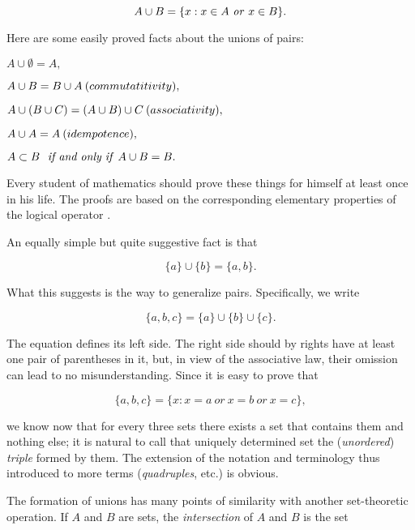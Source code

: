 \begin{equation*}
A \cup B = \{x: x \in A \text{ \textit{or} } x \in B \}.
\end{equation*}

Here are some easily proved facts about the unions of pairs:
\begin{center}
$A \cup \emptyset = A,$

$A \cup B =  B \cup A \: (commutatitivity)\index{commutative},$

$A \cup (B \cup C) = (A \cup B) \cup C \: (associativity)\index{associative},$

$A \cup A = A \:(idempotence)\index{idempotent},$

$ A \subset B \text{ \textit{ if and only if} } A \cup B = B.$
\end{center}

Every student of mathematics should prove these things for himself at least once in his life. The proofs are based on the corresponding elementary properties of the logical operator .

An equally simple but quite suggestive fact is that 

\begin{equation*}
\{ a \} \cup \{ b \} = \{ a, b \}.
\end{equation*}

What this suggests is the way to generalize pairs. Specifically, we write 

\begin{equation*}
 \{ a, b, c \} = \{ a \} \cup \{ b \} \cup \{ c \}.
\end{equation*}

The equation defines its left side. The right side should by rights have at least one pair of parentheses in it, but, in view of the associative law, their omission can lead to no misunderstanding. Since it is easy to prove that 

\begin{equation*}
 \{ a, b, c \} = \{ x: x = a \: or \: x = b \: or \: x = c \},
\end{equation*}

we know now that for every three sets there exists a set that contains them and nothing else; it is natural to call that uniquely determined set the (\textit{unordered}) \textit{triple} formed by them. The extension of the notation and terminology thus introduced to more terms (\textit{quadruples}, etc.) is obvious.

The formation of unions has many points of similarity with another set-theoretic operation. If $A$ and $B$ are sets, the \textit{intersection} of $A$ and $B$ is the set 

